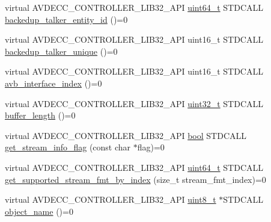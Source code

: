\begin{DoxyCompactItemize}
\item 
virtual A\+V\+D\+E\+C\+C\+\_\+\+C\+O\+N\+T\+R\+O\+L\+L\+E\+R\+\_\+\+L\+I\+B32\+\_\+\+A\+PI \hyperlink{parse_8c_aec6fcb673ff035718c238c8c9d544c47}{uint64\+\_\+t} S\+T\+D\+C\+A\+LL \hyperlink{classavdecc__lib_1_1stream__output__descriptor__response_ae7d527febcff1dc1fa228cc197cf8e44}{backedup\+\_\+talker\+\_\+entity\+\_\+id} ()=0
\item 
virtual A\+V\+D\+E\+C\+C\+\_\+\+C\+O\+N\+T\+R\+O\+L\+L\+E\+R\+\_\+\+L\+I\+B32\+\_\+\+A\+PI uint16\+\_\+t S\+T\+D\+C\+A\+LL \hyperlink{classavdecc__lib_1_1stream__output__descriptor__response_a76c462953d0e3431cba9efb6d8ae5a87}{backedup\+\_\+talker\+\_\+unique} ()=0
\item 
virtual A\+V\+D\+E\+C\+C\+\_\+\+C\+O\+N\+T\+R\+O\+L\+L\+E\+R\+\_\+\+L\+I\+B32\+\_\+\+A\+PI uint16\+\_\+t S\+T\+D\+C\+A\+LL \hyperlink{classavdecc__lib_1_1stream__output__descriptor__response_a8a84689147c9ee2278a6d3692b1c5bb1}{avb\+\_\+interface\+\_\+index} ()=0
\item 
virtual A\+V\+D\+E\+C\+C\+\_\+\+C\+O\+N\+T\+R\+O\+L\+L\+E\+R\+\_\+\+L\+I\+B32\+\_\+\+A\+PI \hyperlink{parse_8c_a6eb1e68cc391dd753bc8ce896dbb8315}{uint32\+\_\+t} S\+T\+D\+C\+A\+LL \hyperlink{classavdecc__lib_1_1stream__output__descriptor__response_a659139f2462ec36f08178dff106e184d}{buffer\+\_\+length} ()=0
\item 
virtual A\+V\+D\+E\+C\+C\+\_\+\+C\+O\+N\+T\+R\+O\+L\+L\+E\+R\+\_\+\+L\+I\+B32\+\_\+\+A\+PI \hyperlink{avb__gptp_8h_af6a258d8f3ee5206d682d799316314b1}{bool} S\+T\+D\+C\+A\+LL \hyperlink{classavdecc__lib_1_1stream__output__descriptor__response_a80ed33723f4afa61e026c32661f731de}{get\+\_\+stream\+\_\+info\+\_\+flag} (const char $\ast$flag)=0
\item 
virtual A\+V\+D\+E\+C\+C\+\_\+\+C\+O\+N\+T\+R\+O\+L\+L\+E\+R\+\_\+\+L\+I\+B32\+\_\+\+A\+PI \hyperlink{parse_8c_aec6fcb673ff035718c238c8c9d544c47}{uint64\+\_\+t} S\+T\+D\+C\+A\+LL \hyperlink{classavdecc__lib_1_1stream__output__descriptor__response_a4e92ab02c01dc1343a66d43403e470a3}{get\+\_\+supported\+\_\+stream\+\_\+fmt\+\_\+by\+\_\+index} (size\+\_\+t stream\+\_\+fmt\+\_\+index)=0
\item 
virtual A\+V\+D\+E\+C\+C\+\_\+\+C\+O\+N\+T\+R\+O\+L\+L\+E\+R\+\_\+\+L\+I\+B32\+\_\+\+A\+PI \hyperlink{stdint_8h_aba7bc1797add20fe3efdf37ced1182c5}{uint8\+\_\+t} $\ast$S\+T\+D\+C\+A\+LL \hyperlink{classavdecc__lib_1_1descriptor__response__base_a133f7774946d80f82b8aaaa4cfbb7361}{object\+\_\+name} ()=0
\end{DoxyCompactItemize}


